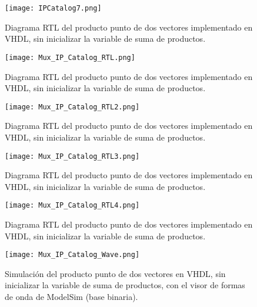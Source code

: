\begin{figure}[ht]
	\centering
	\texttt{[image: IPCatalog7.png]}
	\caption{Diagrama RTL del producto punto de dos vectores implementado en VHDL, sin inicializar la variable de suma de productos. \label{fig:ipcatalog7}}
\end{figure}

\begin{figure}[ht]
	\centering
	\texttt{[image: Mux\_IP\_Catalog\_RTL.png]}
	\caption{Diagrama RTL del producto punto de dos vectores implementado en VHDL, sin inicializar la variable de suma de productos. \label{fig:mux_ipcatalog_rtl}}
\end{figure}

\begin{figure}[ht]
	\centering
	\texttt{[image: Mux\_IP\_Catalog\_RTL2.png]}
	\caption{Diagrama RTL del producto punto de dos vectores implementado en VHDL, sin inicializar la variable de suma de productos. \label{fig:mux_ipcatalog_rtl2}}
\end{figure}

\begin{figure}[ht]
	\centering
	\texttt{[image: Mux\_IP\_Catalog\_RTL3.png]}
	\caption{Diagrama RTL del producto punto de dos vectores implementado en VHDL, sin inicializar la variable de suma de productos. \label{fig:mux_ipcatalog_rtl3}}
\end{figure}

\begin{figure}[ht]
	\centering
	\texttt{[image: Mux\_IP\_Catalog\_RTL4.png]}
	\caption{Diagrama RTL del producto punto de dos vectores implementado en VHDL, sin inicializar la variable de suma de productos. \label{fig:mux_ipcatalog_rtl4}}
\end{figure}

\begin{figure}[ht]
	\centering
	\texttt{[image: Mux\_IP\_Catalog\_Wave.png]}
	\caption{Simulación del producto punto de dos vectores en VHDL, sin inicializar la variable de suma de productos, con el visor de formas de onda de ModelSim (base binaria). \label{fig:for_loop2_vhdl_wavebi}}
\end{figure}